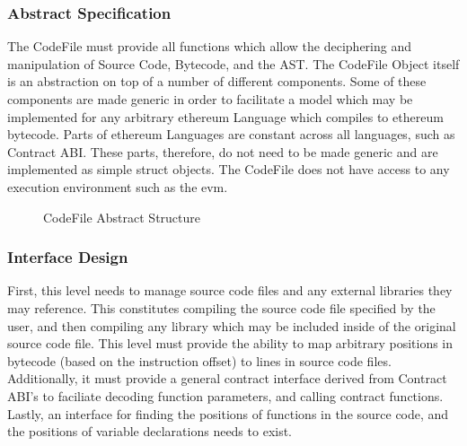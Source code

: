 \documentclass{report}
\begin{document}
    \subsubsection{Abstract Specification}
        The CodeFile must provide all functions which allow the deciphering and manipulation of Source Code, Bytecode, and the AST. The CodeFile Object itself is an abstraction on top  of a number of different components. Some of these components are made generic in order to facilitate a model which may be implemented for any arbitrary \Gls{ethereum} Language which compiles to \Gls{ethereum} bytecode. Parts of \Gls{ethereum} Languages are constant across all languages, such as Contract ABI. These parts, therefore, do not need to be made generic and are implemented as simple struct objects. The CodeFile does not have access to any execution environment such as the \gls{evm}.
    \newpage
    \begin{figure}[!h]
        \caption{CodeFile Abstract Structure}
    \end{figure}

    \subsubsection{Interface Design}
		First, this level needs to manage source code files and any external libraries they may reference. This constitutes compiling the source code file specified by the user, and then compiling any library which may be included inside of the original source code file. This level must provide the ability to map arbitrary positions in bytecode (based on the instruction offset) to lines in source code files. Additionally, it must provide a general contract interface derived from Contract ABI's to faciliate decoding function parameters, and calling contract functions. Lastly, an interface for finding the positions of functions in the source code, and the positions of variable declarations needs to exist.
\end{document}
